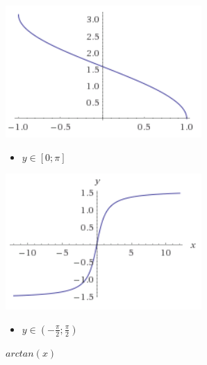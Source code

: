 \begin{figure}[ht!]
	\centering
	\begin{minipage}[t]{0.4\textwidth}
		\centering
		\includegraphics[width=\textwidth]{images/graph_arccos_x}
		\caption{$arccos(x)$}
		\begin{itemize}
			\item $ y \in [0;\pi]$
		\end{itemize}
	\end{minipage}
	\begin{minipage}[t]{0.4\textwidth}
		\centering
		\includegraphics[width=\textwidth]{images/graph_arctan_x}
		\caption{$arctan(x)$}
		\begin{itemize}
			\item $y \in  (-\frac{\pi}{2};\frac{\pi}{2})$
		\end{itemize}
	\end{minipage}
\end{figure}
